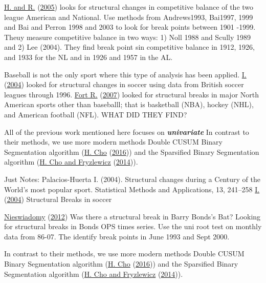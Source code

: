 \documentclass[
  12pt,
]{article}
\begin{document}
\protect\hyperlink{ref-LeeFort2005}{H. and R.}
(\protect\hyperlink{ref-LeeFort2005}{2005}) looks for structural changes
in competitive balance of the two league American and National. Use
methods from Andrews1993, Bai1997, 1999 and Bai and Perron 1998 and 2003
to look for break points between 1901 -1999. Theuy measure competitive
balance in two ways: 1) Noll 1988 and Scully 1989 and 2) Lee (2004).
They find break point sin competitive balance in 1912, 1926, and 1933
for the NL and in 1926 and 1957 in the AL.

Baseball is not the only sport where this type of analysis has been
applied. \protect\hyperlink{ref-PalaciosHuerta2004}{I.}
(\protect\hyperlink{ref-PalaciosHuerta2004}{2004}) looked for structural
changes in soccer using data from British soccer leagues through 1996.
\protect\hyperlink{ref-FortLee2007}{Fort R.}
(\protect\hyperlink{ref-FortLee2007}{2007}) looked for structural breaks
in major North American sports other than baseballl; that is basketball
(NBA), hockey (NHL), and American football (NFL). WHAT DID THEY FIND?

All of the previous work mentioned here focuses on
\textbf{\emph{univariate}} In contrast to their methods, we use more
modern methods Double CUSUM Binary Segmentation algorithm
(\protect\hyperlink{ref-Cho2016}{H. Cho}
(\protect\hyperlink{ref-Cho2016}{2016})) and the Sparsified Binary
Segmentation algorithm (\protect\hyperlink{ref-ChoFryzlewwicz2014}{H.
Cho and Fryzlewicz} (\protect\hyperlink{ref-ChoFryzlewwicz2014}{2014})).

Just Notes: Palacios-Huerta I. (2004). Structural changes during a
Century of the World's most popular sport. Statistical Methods and
Applications, 13, 241--258
\protect\hyperlink{ref-PalaciosHuerta2004}{I.}
(\protect\hyperlink{ref-PalaciosHuerta2004}{2004}) Structural Breaks in
soccer

\protect\hyperlink{ref-Nieswiadomy2012}{Nieswiadomy}
(\protect\hyperlink{ref-Nieswiadomy2012}{2012}) Was there a structural
break in Barry Bonds's Bat? Looking for structural breaks in Bonds OPS
times series. Use the uni root test on monthly data from 86-07. The
identify break points in June 1993 and Sept 2000.

In contrast to their methods, we use more modern methods Double CUSUM
Binary Segmentation algorithm (\protect\hyperlink{ref-Cho2016}{H. Cho}
(\protect\hyperlink{ref-Cho2016}{2016})) and the Sparsified Binary
Segmentation algorithm (\protect\hyperlink{ref-ChoFryzlewwicz2014}{H.
Cho and Fryzlewicz} (\protect\hyperlink{ref-ChoFryzlewwicz2014}{2014})).
\end{document}
